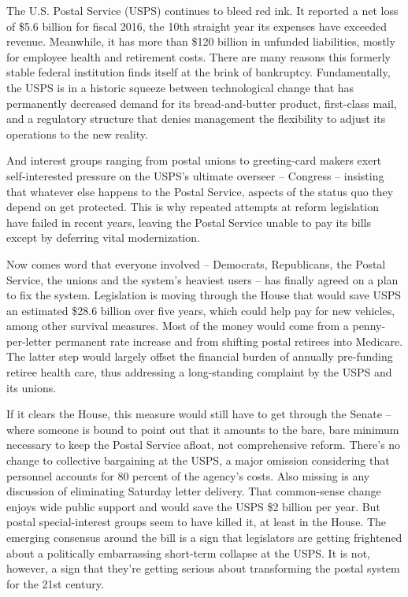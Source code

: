 The U.S. Postal Service (USPS) continues to bleed red ink. It reported a net loss of \$5.6 billion for fiscal 2016, the 10th straight year its expenses have exceeded revenue. Meanwhile, it has more than \$120 billion in unfunded liabilities, mostly for employee health and retirement costs. There are many reasons this formerly stable federal institution finds itself at the brink of bankruptcy. Fundamentally, the USPS is in a historic squeeze between technological change that has permanently decreased demand for its bread-and-butter product, first-class mail, and a regulatory structure that denies management the flexibility to adjust its operations to the new reality.


And interest groups ranging from postal unions to greeting-card makers exert self-interested pressure on the USPS's ultimate overseer – Congress – insisting that whatever else happens to the Postal Service, aspects of the status quo they depend on get protected. This is why repeated attempts at reform legislation have failed in recent years, leaving the Postal Service unable to pay its bills except by deferring vital modernization.


Now comes word that everyone involved – Democrats, Republicans, the Postal Service, the unions and the system's heaviest users – has finally agreed on a plan to fix the system. Legislation is moving through the House that would save USPS an estimated \$28.6 billion over five years, which could help pay for new vehicles, among other survival measures. Most of the money would come from a penny-per-letter permanent rate increase and from shifting postal retirees into Medicare. The latter step would largely offset the financial burden of annually pre-funding retiree health care, thus addressing a long-standing complaint by the USPS and its unions.


If it clears the House, this measure would still have to get through the Senate – where someone is bound to point out that it amounts to the bare, bare minimum necessary to keep the Postal Service afloat, not comprehensive reform. There's no change to collective bargaining at the USPS, a major omission considering that personnel accounts for 80 percent of the agency's costs. Also missing is any discussion of eliminating Saturday letter delivery. That common-sense change enjoys wide public support and would save the USPS \$2 billion per year. But postal special-interest groups seem to have killed it, at least in the House. The emerging consensus around the bill is a sign that legislators are getting frightened about a politically embarrassing short-term collapse at the USPS. It is not, however, a sign that they're getting serious about transforming the postal system for the 21st century.


